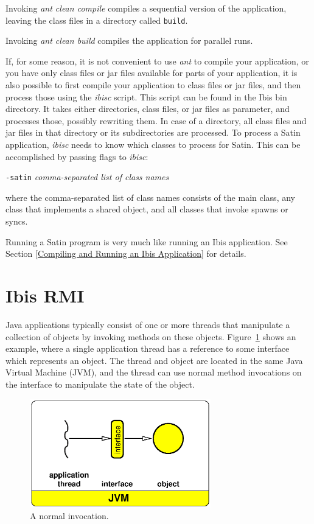 \documentclass[10pt]{article}
\newcommand{\mysection}[1]{\section{#1}\label{#1}}
\begin{document}
Invoking \emph{ant clean compile} compiles a sequential version
of the application, 
leaving the class files in a directory called \texttt{build}.

Invoking \emph{ant clean build} compiles the application for parallel
runs.

If, for some reason, it is not convenient to use \emph{ant} to compile
your application, or you have only class files or jar files available
for parts of your application, it is also possible to first compile
your application to class files or jar files, and then process those
using the \emph{ibisc} script. This script can be found in the Ibis
bin directory. It takes either directories, class files, or jar files
as parameter, and processes those, possibly rewriting them. In case
of a directory, all class files and jar files in that directory or
its subdirectories are processed.
To process a Satin application, \emph{ibisc} needs to know which
classes to process for Satin. This can be accomplished by passing
flags to \emph{ibisc}:

\texttt{-satin} \emph{comma-separated list of class names}

where the comma-separated list of class names consists of the main class,
any class that implements a shared object, and all classes that invoke
spawns or syncs.

Running a Satin program is very much like running an Ibis application.
See Section \ref{Compiling and Running an Ibis Application} for details.

\mysection{Ibis RMI}

Java applications typically consist of one or more threads that
manipulate a collection of objects by invoking methods on these
objects. Figure~\ref{normal-fig} shows an example, where a single application thread
has a reference to some interface which represents an object. The
thread and object are located in the same Java Virtual Machine (JVM),
and the thread can use normal method invocations on the interface to
manipulate the state of the object.

\begin{figure}[t]
\begin{center}
\includegraphics[width=0.7\textwidth]{normal.eps}
\end{center}
\caption{A normal invocation.}
\label{normal-fig}
\end{figure}
\end{document}
